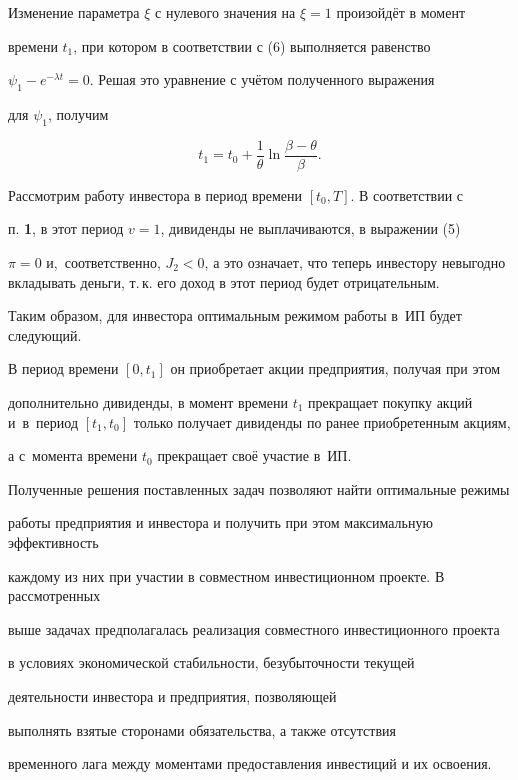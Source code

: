 Изменение параметра $\xi$ с нулевого значения на $\xi=1$ произойдёт в момент 

времени $t_1$, при котором в соответствии с (6) выполняется равенство

$\psi_1-e^{-\lambda t}=0$. Решая это уравнение с учётом полученного выражения 

для $\psi_1$, получим



\[

t_1=t_0+ \frac{1}{\theta} \ln \frac{\beta-\theta}{\beta}.

\]



Рассмотрим работу инвестора в период времени $[t_0,T]$. В соответствии с

п. {\bf 1}, в этот период $v=1$, дивиденды не выплачиваются, в выражении (5)

$\pi=0$ и,~соответственно, $J_2<0$, а это означает, что теперь инвестору невыгодно вкладывать деньги, т.\,к. его доход в этот период будет отрицательным. 



Таким образом, для инвестора оптимальным режимом работы в~ИП будет следующий. 

В период времени $[0,t_1]$ он приобретает акции предприятия, получая при этом 

дополнительно дивиденды, в момент времени $t_1$ прекращает покупку акций и~в~период $[t_1,t_0]$ только получает дивиденды по ранее приобретенным акциям, 

а с~момента времени $t_0$ прекращает своё участие в~ИП.




Полученные решения поставленных задач позволяют найти оптимальные режимы 

работы предприятия и инвестора и получить при этом максимальную эффективность 

каждому из них при участии в совместном инвестиционном проекте. В рассмотренных

выше задачах предполагалась реализация совместного инвестиционного проекта 

в условиях экономической стабильности, безубыточности текущей 

деятельности инвестора и предприятия, позволяющей 

выполнять взятые сторонами обязательства, а также отсутствия 

временного лага между моментами предоставления инвестиций и их освоения. 

